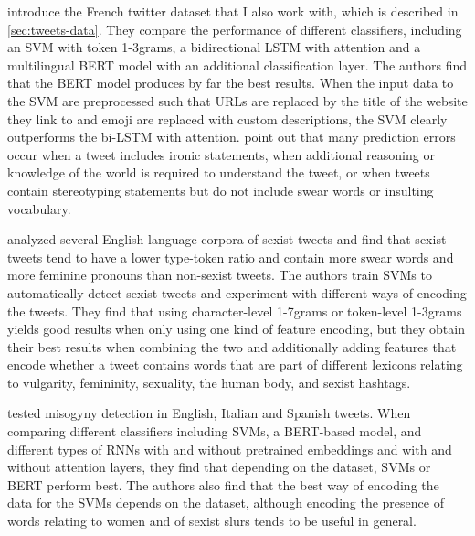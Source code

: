 \citet{chiril2020annotated} introduce the French twitter dataset that I also work with, which is described in \autoref{sec:tweets-data}.
They compare the performance of different classifiers, including an SVM with token 1-3grams, a bidirectional LSTM with attention and a multilingual BERT model with an additional classification layer.
The authors find that the BERT model produces by far the best results.
When the input data to the SVM are preprocessed such that URLs are replaced by the title of the website they link to and emoji are replaced with custom descriptions, the SVM clearly outperforms the bi-LSTM with attention.
\citeauthor{chiril2020annotated} point out that many prediction errors occur when a tweet includes ironic statements, when additional reasoning or knowledge of the world is required to understand the tweet, or when tweets contain stereotyping statements but do not include swear words or insulting vocabulary.

\citet{frenda2019online} analyzed several English-language corpora of sexist tweets and find that sexist tweets tend to have a lower type-token ratio and contain more swear words and more feminine pronouns than non-sexist tweets.
The authors train SVMs to automatically detect sexist tweets and experiment with different ways of encoding the tweets.
They find that using character-level 1-7grams or token-level 1-3grams yields good results when only using one kind of feature encoding, but they obtain their best results when combining the two and additionally adding features that encode whether a tweet contains words that are part of different lexicons relating to vulgarity, femininity, sexuality, the human body, and sexist hashtags.

\citet{pamungkas2020misogyny} tested misogyny detection in English, Italian and Spanish tweets.
When comparing different classifiers including SVMs, a BERT-based model, and different types of RNNs with and without pretrained embeddings and with and without attention layers, they find that depending on the dataset, SVMs or BERT perform best.
The authors also find that the best way of encoding the data for the SVMs depends on the dataset, although encoding the presence of words relating to women and of sexist slurs tends to be useful in general.
